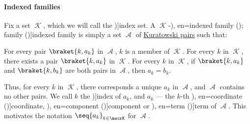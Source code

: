 \paragraph{Indexed families}

\begin{definition}\label{def:indexed_family}
  Fix a set \( \mscrK \), which we will call the \term[en=index set (\cite[34]{Halmos1960NaiveSetTheory})]{index set}. A \( \mscrK \)-\term[ru=индексированное семейство (\cite[8]{Архангельский1988КанторовскаяТеорияМножеств}), en=indexed family (\cite[2]{Engelking1989GeneralTopology}); family (\cite[34]{Halmos1960NaiveSetTheory})]{indexed family} is simply a set \( \mscrA \) of \hyperref[def:kuratowski_pair]{Kuratowski pairs} such that:
  \begin{thmenum}
     For every pair \( \braket{ k, a_k } \) in \( \mscrA \), \( k \) is a member of \( \mscrK \).
     For every \( k \) in \( \mscrK \), there exists a pair \( \braket{ k, a_k } \) in \( \mscrK \).
     For every \( k \) in \( \mscrK \),  if \( \braket{ k, a_k } \) and \( \braket{ k, b_k } \) are both pairs in \( \mscrA \), then \( a_k = b_k \).
  \end{thmenum}

  Thus, for every \( k \) in \( \mscrK \), there corresponds a unique \( a_k \) in \( \mscrA \), and \( \mscrA \) contains no other pairs. We call \( k \) the \term[en=index (\cite[36]{Halmos1960NaiveSetTheory})]{index} of \( a_k \), and \( a_k \) --- the \( k \)-th \term[ru=координата (\cite[11]{Архангельский1988КанторовскаяТеорияМножеств}), en=coordinate (\cite[36]{Halmos1960NaiveSetTheory})]{coordinate}, \term[bg=компонента (\cite[367]{ГеновМиховскиМоллов1991Алгебра}), en=component (\cite[35]{Enderton1977SetTheory})]{component} or \term[ru=терм (\cite[11]{Архангельский1988КанторовскаяТеорияМножеств}), en=term (\cite[34]{Halmos1960NaiveSetTheory})]{term} of \( \mscrA \). This motivates the notation \( \seq{ a_k }_{k \in \mscrK} \) for \( \mscrA \).


\end{definition}
